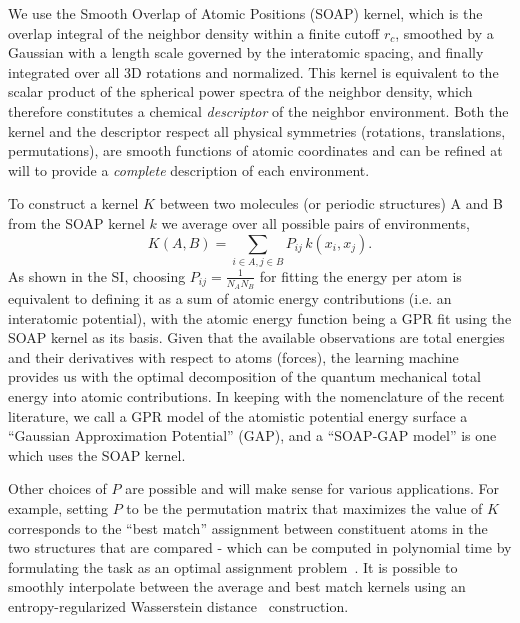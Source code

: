 \documentclass[12pt]{article}
\begin{document}
We use the Smooth Overlap of Atomic Positions (SOAP) kernel, which is the overlap integral of the neighbor density within a finite cutoff $r_c$, smoothed by a Gaussian with a length scale governed by the interatomic spacing, and finally integrated over all 3D rotations and normalized. This kernel is equivalent to the scalar product of the spherical power spectra of the neighbor density\cite{bart+13prb}, which
therefore constitutes a chemical {\em descriptor} of the neighbor environment. Both the kernel and 
the descriptor respect all physical symmetries (rotations, translations, permutations), are smooth functions of atomic coordinates and can be refined at will to provide a \emph{complete} description of each
environment.

To construct a kernel $K$ between two molecules (or periodic  structures) A and B from the SOAP kernel $k$ we average  over all possible pairs of environments,
\begin{equation}
K(A,B)=\sum_{i\in A, j\in B} P_{ij} \, k\left(x_i,x_j\right).
\label{eq:mol2env}
\end{equation} 
As shown in the SI, choosing $P_{ij} = \frac{1}{N_A N_B}$ for fitting the energy per atom is equivalent to defining it as a sum of atomic energy contributions (i.e. an interatomic potential), with the atomic energy function being a GPR fit using the SOAP kernel as its basis. 
%
Given that the available  observations 
%
are total energies and their derivatives with respect to atoms (forces), the learning machine provides us with the optimal decomposition of the quantum mechanical total energy into atomic contributions. In keeping with the nomenclature of the recent literature, we call a GPR model of the atomistic potential energy surface a ``Gaussian Approximation Potential'' (GAP), and a ``SOAP-GAP model'' is one which uses the SOAP kernel.

Other choices of $P$  are possible and will make sense for various applications. For example, setting $P$ to be the permutation matrix that maximizes the value of $K$ corresponds to the ``best match'' assignment between constituent atoms in the two structures that are compared - which can be computed in polynomial time by formulating the task as an optimal assignment problem~\cite{kuhn55nrlq}. It is possible to smoothly interpolate between the %
average 
%
and best match kernels using an entropy-regularized Wasserstein distance~\cite{cutu13nips} construction.   

%
%
\end{document}
